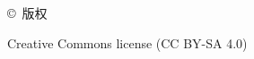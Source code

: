 \begin{flushleft}
    \copyright~版权~\the\year~\DICTDocAuthor
\end{flushleft}
 Creative Commons license (CC BY-SA 4.0)